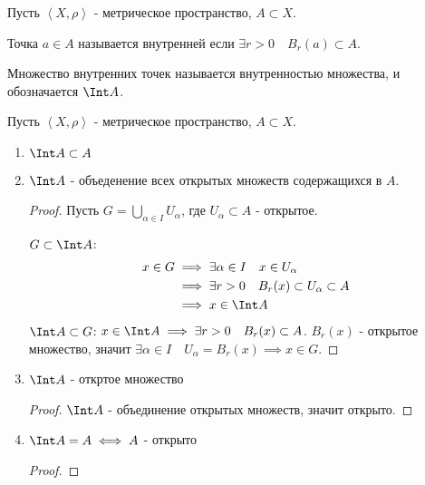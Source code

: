 
\begin{definition}[повтор] \thmslashn 

    Пусть $\left<X, \rho\right>$ - метрическое пространство, $A \subset X$.

    Точка $a\in A$ называется внутренней если $\exists{r > 0}\quad B_{r}(a) \subset A$.

    Множество внутренних точек называется внутренностью множества, и обозначается $\Int A$.
\end{definition}

\begin{properties} \thmslashn

    Пусть $\left<X, \rho\right>$ - метрическое пространство, $A \subset X$.

    \begin{enumerate}
        \item $\Int A \subset A$
        \item $\Int A$ - объеденение всех открытых множеств содержащихся в $A$.
            \begin{proof} \thmslashn
            
                Пусть $G = \bigcup\limits_{\alpha\in I} U_{\alpha}$, где $U_{\alpha} \subset A$ - открытое.

                $G \subset \Int A$:
                \begin{equation*}
                    \begin{split}
                        x\in G 
                        &\implies \exists{\alpha\in I}\quad x\in U_{\alpha}\\
                        &\implies \exists{r > 0}\quad B_{r}(x) \subset U_{\alpha} \subset A\\
                        &\implies x\in \Int A
                    \end{split}
                \end{equation*}
                $\Int A \subset G$:  $x\in \Int A \implies \exists{r > 0}\quad B_{r}(x) \subset A$. $B_{r}(x)$ - открытое множество, значит $\exists{\alpha\in I}\quad U_{\alpha} = B_{r}(x) \implies x\in G$.
            \end{proof}
        \item $\Int A$ - откртое множество
            \begin{proof} \thmslashn
            
                $\Int A$ - объединение открытых множеств, значит открыто.
            \end{proof}
        \item $\Int A = A \iff A$ - открыто
            \begin{proof} \thmslashn
            

\end{proof}
\end{enumerate}
\end{properties}
